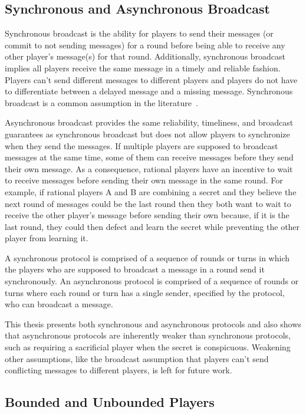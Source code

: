 \documentclass[12pt]{dalcsthesis}
\begin{document}
\subsection{Synchronous and Asynchronous Broadcast}
\label{Def:Broadcast}

Synchronous broadcast is the ability for players to send their messages (or commit to not sending messages) for a round before being able to receive any other player's message(s) for that round. Additionally, synchronous broadcast implies all players receive the same message in a timely and reliable fashion. Players can't send different messages to different players and players do not have to differentiate between a delayed message and a missing message. Synchronous broadcast is a common assumption in the literature~\cite{fuch10, gordon06, halpern04, kol08-2, kol08, maleka08, ong09}.

Asynchronous broadcast provides the same reliability, timeliness, and broadcast guarantees as synchronous broadcast but does not allow players to synchronize when they send the messages. If multiple players are supposed to broadcast messages at the same time, some of them can receive messages before they send their own message. As a consequence, rational players have an incentive to wait to receive messages before sending their own message in the same round. For example, if rational players A and B are combining a secret and they believe the next round of messages could be the last round then they both want to wait to receive the other player's message before sending their own because, if it is the last round, they could then defect and learn the secret while preventing the other player from learning it.

A synchronous protocol is comprised of a sequence of rounds or turns in which the players who are supposed to broadcast a message in a round send it synchronously. An asynchronous protocol is comprised of a sequence of rounds or turns where each round or turn has a single sender, specified by the protocol, who can broadcast a message.

This thesis presents both synchronous and asynchronous protocols and also shows that asynchronous protocols are inherently weaker than synchronous protocols, such as requiring a sacrificial player when the secret is conspicuous. Weakening other assumptions, like the broadcast assumption that players can't send conflicting messages to different players, is left for future work.

\subsection{Bounded and Unbounded Players}
\end{document}
